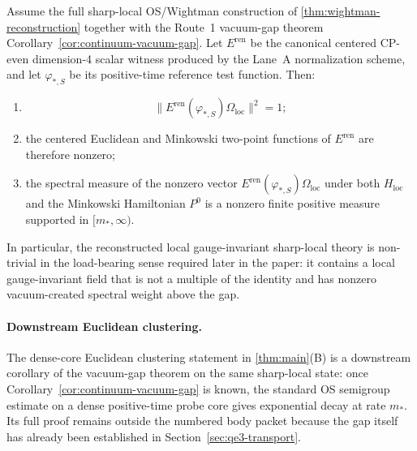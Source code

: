 \begin{theorem}\label{thm:nontriviality}
Assume the full sharp-local OS/Wightman construction of \cref{thm:wightman-reconstruction} together with the Route~1 vacuum-gap theorem Corollary~\ref{cor:continuum-vacuum-gap}. Let $E^{\mathrm{ren}}$ be the canonical centered CP-even dimension-4 scalar witness produced by the Lane~A normalization scheme, and let $\varphi_{*,S}$ be its positive-time reference test function. Then:
\begin{enumerate}[label=\textup{(\roman*)},leftmargin=2.25em]
\item
\[
\|E^{\mathrm{ren}}(\varphi_{*,S})\Omega_{\mathrm{loc}}\|^2=1;
\]
\item the centered Euclidean and Minkowski two-point functions of $E^{\mathrm{ren}}$ are therefore nonzero;
\item the spectral measure of the nonzero vector $E^{\mathrm{ren}}(\varphi_{*,S})\Omega_{\mathrm{loc}}$ under both $H_{\mathrm{loc}}$ and the Minkowski Hamiltonian $P^0$ is a nonzero finite positive measure supported in $[m_*,\infty)$.
\end{enumerate}
In particular, the reconstructed local gauge-invariant sharp-local theory is non-trivial in the load-bearing sense required later in the paper: it contains a local gauge-invariant field that is not a multiple of the identity and has nonzero vacuum-created spectral weight above the gap.
\end{theorem}


\paragraph{Downstream Euclidean clustering.}
The dense-core Euclidean clustering statement in \cref{thm:main}(B) is a downstream corollary of the vacuum-gap theorem on the same sharp-local state: once Corollary~\ref{cor:continuum-vacuum-gap} is known, the standard OS semigroup estimate on a dense positive-time probe core gives exponential decay at rate $m_*$. Its full proof remains outside the numbered body packet because the gap itself has already been established in Section~\ref{sec:qe3-transport}.

